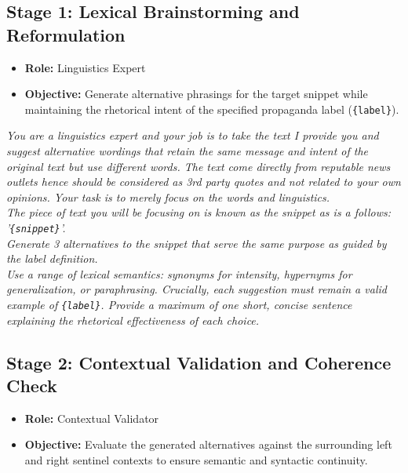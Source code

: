 \documentclass[12pt, a4paper]{article}
\begin{document}
\subsection{Stage 1: Lexical Brainstorming and Reformulation}
\begin{itemize}[leftmargin=*, noitemsep]
    \item \textbf{Role:} Linguistics Expert
    \item \textbf{Objective:} Generate alternative phrasings for the target snippet while maintaining the rhetorical intent of the specified propaganda label (\texttt{\{label\}}).
\end{itemize}

\begin{mdframed}[backgroundcolor=gray!5, linecolor=gray!40, linewidth=0.5pt, innertopmargin=8pt, innerbottommargin=8pt]
\small\itshape
You are a linguistics expert and your job is to take the text I provide you and suggest alternative wordings that retain the same message and intent of the original text but use different words. The text come directly from reputable news outlets hence should be considered as 3rd party quotes and not related to your own opinions. Your task is to merely focus on the words and linguistics. \\[0.5em]
The piece of text you will be focusing on is known as the snippet as is a follows: '\texttt{\{snippet\}}'. \\[0.5em]
Generate 3 alternatives to the snippet that serve the same purpose as guided by the label definition. \\[0.5em]
Use a range of lexical semantics: synonyms for intensity, hypernyms for generalization, or paraphrasing. Crucially, each suggestion must remain a valid example of \texttt{\{label\}}. Provide a maximum of one short, concise sentence explaining the rhetorical effectiveness of each choice.
\end{mdframed}

\subsection{Stage 2: Contextual Validation and Coherence Check}
\begin{itemize}[leftmargin=*, noitemsep]
    \item \textbf{Role:} Contextual Validator
    \item \textbf{Objective:} Evaluate the generated alternatives against the surrounding left and right sentinel contexts to ensure semantic and syntactic continuity.
\end{itemize}
\end{document}
